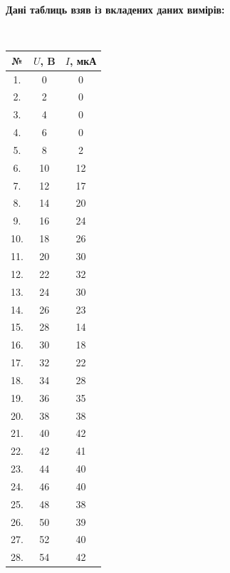 \documentclass[12pt,a4paper]{article}
\begin{document}
    \setlength{\parindent}{0em}

    \textbf{Дані таблиць взяв із вкладених даних вимірів:}

    \setlength{\parindent}{1.5em}

    \vspace{1em}

    \noindent
    \begin{minipage}[t]{0.48\textwidth}
    \\[2em]

    \vspace{0.5em}
    \begin{tabular}{|c|c|c|}
    \hline
    № & $U$, B & $I$, мкА \\
    \hline
    1. & 0 & 0 \\
    2. & 2 & 0 \\
    3. & 4 & 0 \\
    4. & 6 & 0 \\
    5. & 8 & 2 \\
    6. & 10 & 12 \\
    7. & 12 & 17 \\
    8. & 14 & 20 \\
    9. & 16 & 24 \\
    10. & 18 & 26 \\
    11. & 20 & 30 \\
    12. & 22 & 32 \\
    13. & 24 & 30 \\
    14. & 26 & 23 \\
    15. & 28 & 14 \\
    16. & 30 & 18 \\
    17. & 32 & 22 \\
    18. & 34 & 28 \\
    19. & 36 & 35 \\
    20. & 38 & 38 \\
    21. & 40 & 42 \\
    22. & 42 & 41 \\
    23. & 44 & 40 \\
    24. & 46 & 40 \\
    25. & 48 & 38 \\
    26. & 50 & 39 \\
    27. & 52 & 40 \\
    28. & 54 & 42 \\
    \hline
    \end{tabular}
    \end{minipage}
\end{document}
